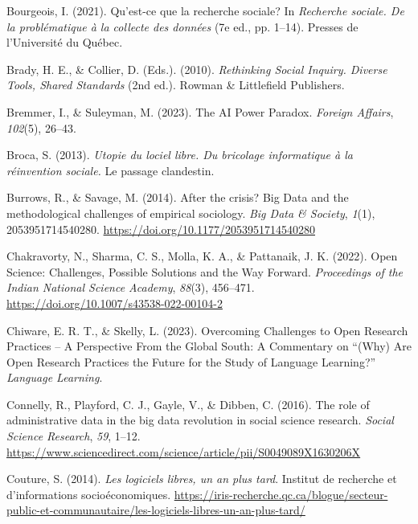 \documentclass[
  letterpaper,
  DIV=11,
  numbers=noendperiod]{scrreprt}
\newlength{\cslhangindent}
\newlength{\cslentryspacingunit} %
\newenvironment{CSLReferences}[2] %
 {%
  \setlength{\parindent}{0pt}
  \ifodd #1
  \let\oldpar\par
  \def\par{\hangindent=\cslhangindent\oldpar}
  \fi
  \setlength{\parskip}{#2\cslentryspacingunit}
 }%
 {}
\begin{document}
\begin{CSLReferences}{1}{0}
\leavevmode{}%
Bourgeois, I. (2021). Qu'est-ce que la recherche sociale? In
\emph{Recherche sociale. {De} la problématique à la collecte des
données} (7e ed., pp. 1--14). Presses de l'Université du Québec.

\leavevmode{}%
Brady, H. E., \& Collier, D. (Eds.). (2010). \emph{Rethinking {Social
Inquiry}. {Diverse Tools}, {Shared Standards}} (2nd ed.). Rowman \&
Littlefield Publishers.

\leavevmode{}%
Bremmer, I., \& Suleyman, M. (2023). The {AI Power Paradox}.
\emph{Foreign Affairs}, \emph{102}(5), 26--43.

\leavevmode{}%
Broca, S. (2013). \emph{Utopie du lociel libre. {Du} bricolage
informatique à la réinvention sociale.} Le passage clandestin.

\leavevmode{}%
Burrows, R., \& Savage, M. (2014). After the crisis? {Big Data} and the
methodological challenges of empirical sociology. \emph{Big Data \&
Society}, \emph{1}(1), 2053951714540280.
\url{https://doi.org/10.1177/2053951714540280}

\leavevmode{}%
Chakravorty, N., Sharma, C. S., Molla, K. A., \& Pattanaik, J. K.
(2022). Open {Science}: {Challenges}, {Possible Solutions} and the {Way
Forward}. \emph{Proceedings of the Indian National Science Academy},
\emph{88}(3), 456--471. \url{https://doi.org/10.1007/s43538-022-00104-2}

\leavevmode{}%
Chiware, E. R. T., \& Skelly, L. (2023). Overcoming {Challenges} to
{Open Research Practices} -- {A Perspective From} the {Global South}: {A
Commentary} on {``({Why}) {Are Open Research Practices} the {Future} for
the {Study} of {Language Learning}?''} \emph{Language Learning}.

\leavevmode{}%
Connelly, R., Playford, C. J., Gayle, V., \& Dibben, C. (2016). The role
of administrative data in the big data revolution in social science
research. \emph{Social Science Research}, \emph{59}, 1--12.
\url{https://www.sciencedirect.com/science/article/pii/S0049089X1630206X}

\leavevmode{}%
Couture, S. (2014). \emph{Les logiciels libres, un an plus tard}.
Institut de recherche et d'informations socioéconomiques.
\url{https://iris-recherche.qc.ca/blogue/secteur-public-et-communautaire/les-logiciels-libres-un-an-plus-tard/}


\end{CSLReferences}
\end{document}
